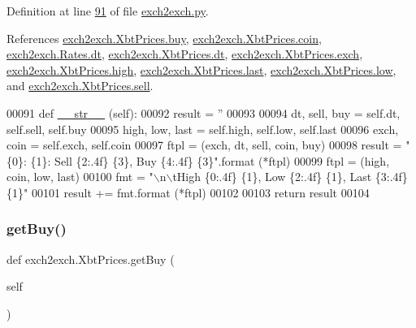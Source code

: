 Definition at line \hyperlink{exch2exch_8py_source_l00091}{91} of file \hyperlink{exch2exch_8py_source}{exch2exch.\+py}.



References \hyperlink{exch2exch_8py_source_l00059}{exch2exch.\+Xbt\+Prices.\+buy}, \hyperlink{exch2exch_8py_source_l00065}{exch2exch.\+Xbt\+Prices.\+coin}, \hyperlink{exch2exch_8py_source_l00028}{exch2exch.\+Rates.\+dt}, \hyperlink{exch2exch_8py_source_l00057}{exch2exch.\+Xbt\+Prices.\+dt}, \hyperlink{exch2exch_8py_source_l00064}{exch2exch.\+Xbt\+Prices.\+exch}, \hyperlink{exch2exch_8py_source_l00061}{exch2exch.\+Xbt\+Prices.\+high}, \hyperlink{exch2exch_8py_source_l00063}{exch2exch.\+Xbt\+Prices.\+last}, \hyperlink{exch2exch_8py_source_l00062}{exch2exch.\+Xbt\+Prices.\+low}, and \hyperlink{exch2exch_8py_source_l00058}{exch2exch.\+Xbt\+Prices.\+sell}.


\begin{DoxyCode}
00091     \textcolor{keyword}{def }\hyperlink{namespacerates_a2f1a70c33ee9e255938e4c19fd207264}{\_\_str\_\_} (self):
00092         result = \textcolor{stringliteral}{''}
00093         
00094         dt, sell, buy   = self.dt, self.sell, self.buy
00095         high, low, last = self.high, self.low, self.last
00096         exch, coin      = self.exch, self.coin
00097         ftpl = (exch, dt, sell, coin, buy)
00098         result  = \textcolor{stringliteral}{"\{0\}: \{1\}: Sell \{2:.4f\} \{3\}, Buy \{4:.4f\} \{3\}"}.format (*ftpl)
00099         ftpl    = (high, coin, low, last)
00100         fmt     = \textcolor{stringliteral}{"\(\backslash\)n\(\backslash\)tHigh \{0:.4f\} \{1\}, Low \{2:.4f\} \{1\}, Last \{3:.4f\} \{1\}"}
00101         result += fmt.format (*ftpl)
00102         
00103         \textcolor{keywordflow}{return} result
00104         
\end{DoxyCode}
\mbox{\label{classexch2exch_1_1_xbt_prices_aa7cda2f119828f77250dcafc3a0e1dfc}} 
\subsubsection{\texorpdfstring{get\+Buy()}{getBuy()}}
{\footnotesize\ttfamily def exch2exch.\+Xbt\+Prices.\+get\+Buy (\begin{DoxyParamCaption}\item[{}]{self }\end{DoxyParamCaption})}



